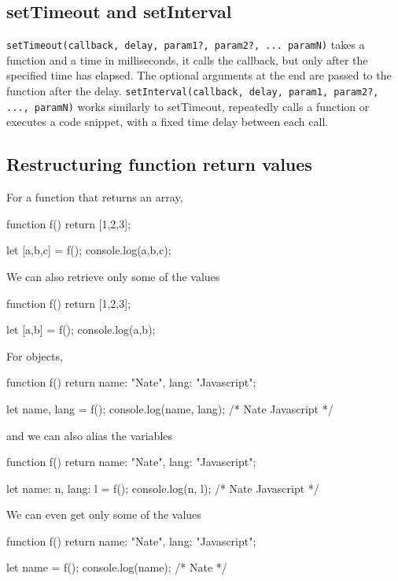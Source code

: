 \documentclass{report}
\begin{document}
    \subsection{setTimeout and setInterval}
    \bigbreak \noindent 
    \texttt{setTimeout(callback, delay, param1?, param2?, ... paramN)} takes a  function and a time in milliseconds, it calls the callback, but only after the specified time has elapsed. The optional arguments at the end are passed to the function after the delay.
    \bigbreak \noindent 
    \texttt{setInterval(callback, delay, param1, param2?, ..., paramN)} works similarly to setTimeout, repeatedly calls a function or executes a code snippet, with a fixed time delay between each call.

    \bigbreak \noindent 
    \subsection{Restructuring function return values}
    \bigbreak \noindent 
    For a function that returns an array, 
    \bigbreak \noindent 
    \begin{jscode}
        function f() {
            return [1,2,3];
        }

        let [a,b,c] = f();
        console.log(a,b,c);
    \end{jscode}
    \bigbreak \noindent 
    We can also retrieve only some of the values
    \bigbreak \noindent 
    \begin{jscode}
        function f() {
            return [1,2,3];
        }

        let [a,b] = f();
        console.log(a,b);
    \end{jscode}
    \bigbreak \noindent 
    For objects, 
    \bigbreak \noindent 
    \begin{jscode}
        function f() {
            return {name: "Nate", lang: "Javascript"};
        }

        let {name, lang} = f();
        console.log(name, lang);
        /*
        Nate Javascript
        */
    \end{jscode}
    \bigbreak \noindent 
    and we can also alias the variables
    \bigbreak \noindent 
    \begin{jscode}
        function f() {
            return {name: "Nate", lang: "Javascript"};
        }

        let {name: n, lang: l} = f();
        console.log(n, l);
        /*
        Nate Javascript
        */
    \end{jscode}
    \bigbreak \noindent 
    We can even get only some of the values
    \bigbreak \noindent 
    \begin{jscode}
        function f() {
            return {name: "Nate", lang: "Javascript"};
        }

        let {name} = f();
        console.log(name);
        /*
        Nate
        */
    \end{jscode}
\end{document}
